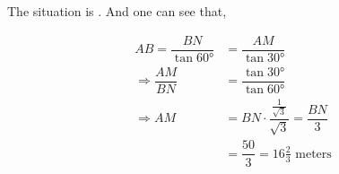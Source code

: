 \begin{solution}
	The situation is \asif. And one can see that,
	
	\begin{align}
		AB = \dfrac{BN}{\tan\ang{60}} &= \dfrac{AM}{\tan\ang{30}} \\
		\Rightarrow \dfrac{AM}{BN} &= \dfrac{\tan\ang{30}}{\tan\ang{60}} \\
		\Rightarrow AM &= BN\cdot\dfrac{\frac{1}{\sqrt{3}}}{\sqrt{3}} = \dfrac{BN}{3} \\
		               &= \dfrac{50}{3} = 16\frac{2}{3}\text{ meters}
	\end{align}
\end{solution}

